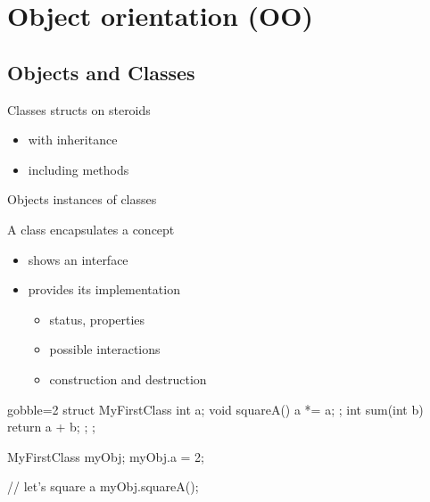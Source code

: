 \section[OO]{Object orientation (OO)}

\subsection[Objects]{Objects and Classes}

\begin{frame}[fragile]
  \begin{block}{Classes}
    structs on steroids
    \begin{itemize}
    \item with inheritance
    \item including methods
    \end{itemize}
  \end{block}
  \begin{block}{Objects}
    instances of classes
  \end{block}
  \begin{block}{A class encapsulates a concept}
    \begin{itemize}
    \item shows an interface
    \item provides its implementation
      \begin{itemize}
      \item status, properties
      \item possible interactions
      \item construction and destruction
      \end{itemize}    
    \end{itemize}    
  \end{block}
\end{frame}


\begin{frame}[fragile]
  \begin{multicols}{2}
    \begin{cppcode*}{gobble=2}
      struct MyFirstClass {
        int a;
        void squareA() {
          a *= a;
        };
        int sum(int b) {
          return a + b;
        };
      };

      MyFirstClass myObj;
      myObj.a = 2;

      // let's square a
      myObj.squareA();
    \end{cppcode*}
    \columnbreak
    \center
    \null \vfill
    \vfill \null
  \end{multicols}
\end{frame}

